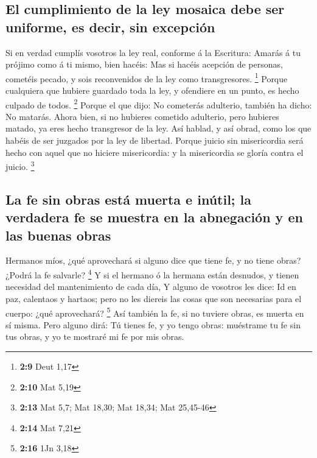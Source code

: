 \hypertarget{el-cumplimiento-de-la-ley-mosaica-debe-ser-uniforme-es-decir-sin-excepciuxf3n}{%
\subsection{El cumplimiento de la ley mosaica debe ser uniforme, es
decir, sin
excepción}\label{el-cumplimiento-de-la-ley-mosaica-debe-ser-uniforme-es-decir-sin-excepciuxf3n}}

 Si en verdad cumplís vosotros la ley real, conforme á la
Escritura: Amarás á tu prójimo como á ti mismo, bien hacéis:
 Mas si hacéis acepción de personas, cometéis pecado, y
sois reconvenidos de la ley como transgresores. \footnote{\textbf{2:9}
  Deut 1,17}  Porque cualquiera que hubiere guardado toda
la ley, y ofendiere en un punto, es hecho culpado de todos. \footnote{\textbf{2:10}
  Mat 5,19}  Porque el que dijo: No cometerás adulterio,
también ha dicho: No matarás. Ahora bien, si no hubieres cometido
adulterio, pero hubieres matado, ya eres hecho transgresor de la ley.
 Así hablad, y así obrad, como los que habéis de ser
juzgados por la ley de libertad.  Porque juicio sin
misericordia será hecho con aquel que no hiciere misericordia: y la
misericordia se gloría contra el juicio. \footnote{\textbf{2:13} Mat
  5,7; Mat 18,30; Mat 18,34; Mat 25,45-46}

\hypertarget{la-fe-sin-obras-estuxe1-muerta-e-inuxfatil-la-verdadera-fe-se-muestra-en-la-abnegaciuxf3n-y-en-las-buenas-obras}{%
\subsection{La fe sin obras está muerta e inútil; la verdadera fe se
muestra en la abnegación y en las buenas
obras}\label{la-fe-sin-obras-estuxe1-muerta-e-inuxfatil-la-verdadera-fe-se-muestra-en-la-abnegaciuxf3n-y-en-las-buenas-obras}}

 Hermanos míos, ¿qué aprovechará si alguno dice que tiene
fe, y no tiene obras? ¿Podrá la fe salvarle? \footnote{\textbf{2:14} Mat
  7,21}  Y si el hermano ó la hermana están desnudos, y
tienen necesidad del mantenimiento de cada día,  Y alguno
de vosotros les dice: Id en paz, calentaos y hartaos; pero no les
diereis las cosas que son necesarias para el cuerpo: ¿qué aprovechará?
\footnote{\textbf{2:16} 1Jn 3,18}  Así también la fe, si
no tuviere obras, es muerta en sí misma.  Pero alguno
dirá: Tú tienes fe, y yo tengo obras: muéstrame tu fe sin tus obras, y
yo te mostraré mi fe por mis obras.

